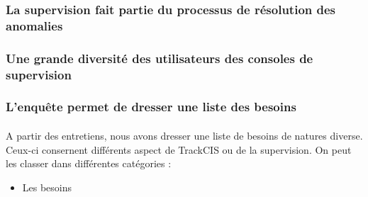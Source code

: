 		\subsubsection{La supervision fait partie du processus de résolution des
		anomalies}
			\paragraph{}%
			
			\paragraph{}%
			
			\paragraph{}%
			
		\subsubsection{Une grande diversité des utilisateurs des consoles de
		supervision}
			\paragraph{}%
			
			\paragraph{}%
			
		\subsubsection{L'enquête permet de dresser une liste des besoins}
			\paragraph{}%
			
			\paragraph{}%
			
			\paragraph{}%
			A partir des entretiens, nous avons dresser une liste de besoins de natures
			diverse. Ceux-ci consernent différents aspect de TrackCIS ou de la
			supervision. On peut les classer dans différentes catégories :
			\begin{itemize}
			  \item Les besoins
			\end{itemize}
	

